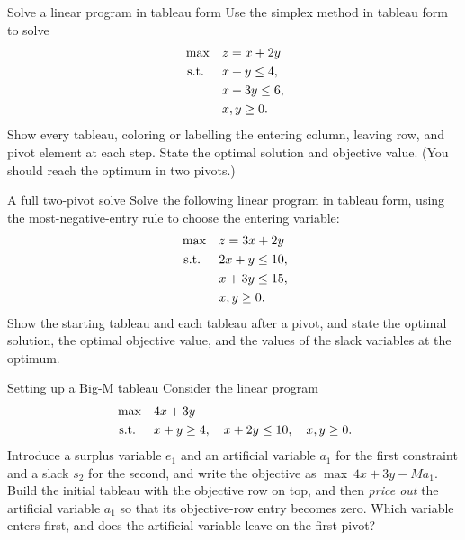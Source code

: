 \begin{ex}{Solve a linear program in tableau form}{}
\label{ex:tableau-solve-lp}
 Use the simplex method in tableau form to solve
\[
\begin{aligned}
\max\quad & z = x + 2y\\
\mbox{ s.t. }\quad  & x + y  \le 4,\\
          & x + 3y \le 6,\\
          & x, y \ge 0.
\end{aligned}
\]
Show every tableau, coloring or labelling the entering column, leaving row, and pivot element at each step. State the optimal solution and objective value. (You should reach the optimum in two pivots.)
\exrefs{\S\ref{sec:tableau-pivot}; \S\ref{sec:tableau-optimality}}
\end{ex}

\begin{ex}{A full two-pivot solve}{}
\label{ex:tableau-two-pivot-solve}
 Solve the following linear program in tableau form, using the most-negative-entry rule to choose the entering variable:
\[
\begin{aligned}
\max\quad & z = 3x + 2y\\
\mbox{ s.t. }\quad  & 2x + y  \le 10,\\
          & x + 3y \le 15,\\
          & x, y \ge 0.
\end{aligned}
\]
Show the starting tableau and each tableau after a pivot, and state the optimal solution, the optimal objective value, and the values of the slack variables at the optimum.
\exrefs{\S\ref{sec:tableau-pivot}; \S\ref{sec:tableau-optimality}}
\end{ex}

\begin{ex}{Setting up a Big-M tableau}{}
\label{ex:tableau-bigm-setup}
 Consider the linear program
\[
\begin{aligned}
\max\quad & 4x + 3y \\
\mbox{ s.t. }\quad  & x + y \ge 4,\quad x + 2y \le 10,\quad x,y \ge 0.
\end{aligned}
\]
Introduce a surplus variable $e_1$ and an artificial variable $a_1$ for the first constraint and a slack $s_2$ for the second, and write the objective as $\max\ 4x + 3y - M a_1$. Build the initial tableau with the objective row on top, and then \emph{price out} the artificial variable $a_1$ so that its objective-row entry becomes zero. Which variable enters first, and does the artificial variable leave on the first pivot?
\exrefs{\S\ref{sec:tableau-bigm}}
\end{ex}


